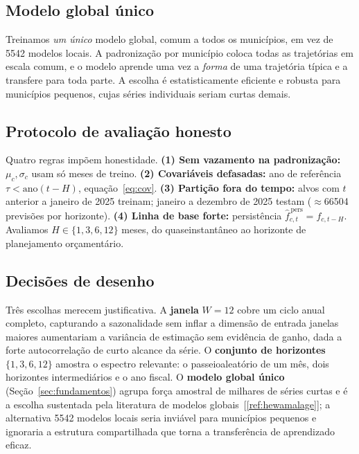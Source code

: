 \documentclass[12pt,a4paper,oneside]{article}
\newcommand{\C}[1]{[\ref{#1}]}
\begin{document}
\subsection{Modelo global único}

Treinamos \emph{um único} modelo global, comum a todos os municípios, em
vez de \num{5542} modelos locais. A padronização por município coloca
todas as trajetórias em escala comum, e o modelo aprende uma vez a
\emph{forma} de uma trajetória típica e a transfere para toda parte.
A escolha é estatisticamente eficiente e robusta para municípios pequenos,
cujas séries individuais seriam curtas demais.

\subsection{Protocolo de avaliação honesto}
\label{sec:protocolo}

Quatro regras impõem honestidade. \textbf{(1) Sem vazamento na
padronização:} $\mu_c,\sigma_c$ usam só meses de treino. \textbf{(2)
Covariáveis defasadas:} ano de referência $\tau<\text{ano}(t-H)$,
equação~\eqref{eq:cov}. \textbf{(3) Partição fora do tempo:} alvos com $t$
anterior a janeiro de 2025 treinam; janeiro a dezembro de 2025 testam
($\approx$\num{66504} previsões por horizonte). \textbf{(4) Linha de base
forte:} persistência $\widehat{f}^{\,\text{pers}}_{c,t}=f_{c,t-H}$.
Avaliamos $H\in\{1,3,6,12\}$ meses, do quase\-instantâneo ao horizonte de
planejamento orçamentário.

\subsection{Decisões de desenho}

Três escolhas merecem justificativa. A \textbf{janela} $W=12$ cobre um
ciclo anual completo, capturando a sazonalidade sem inflar a dimensão de
entrada \textemdash{} janelas maiores aumentariam a variância de estimação
sem evidência de ganho, dada a forte autocorrelação de curto alcance da
série. O \textbf{conjunto de horizontes} $\{1,3,6,12\}$ amostra o espectro
relevante: o passeio\-aleatório de um mês, dois horizontes intermediários e
o ano fiscal. O \textbf{modelo global único} (Seção~\ref{sec:fundamentos})
agrupa força amostral de milhares de séries curtas e é a escolha
sustentada pela literatura de modelos globais~\C{ref:hewamalage}; a
alternativa \textemdash{} \num{5542} modelos locais \textemdash{} seria
inviável para municípios pequenos e ignoraria a estrutura compartilhada que
torna a transferência de aprendizado eficaz.
\end{document}
